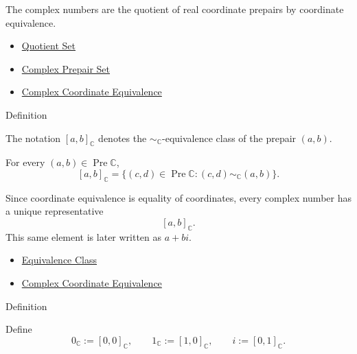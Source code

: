 \begin{remark*}[Interpretation]
The complex numbers are the quotient of real coordinate prepairs by coordinate
equivalence.
\end{remark*}

\begin{dependencies}
\begin{itemize}
  \item \hyperref[def:quotient-set]{Quotient Set}
  \item \hyperref[def:complex-prepair-set]{Complex Prepair Set}
  \item \hyperref[def:complex-coordinate-equivalence]{Complex Coordinate Equivalence}
\end{itemize}
\end{dependencies}

\begin{definitionbox}{Definition}
\begin{definition}
\label{def:complex-class-notation}
The notation $[a,b]_{\mathbb{C}}$ denotes the
\(\sim_{\mathbb{C}}\)-equivalence class of the prepair $(a,b)$.
\end{definition}
\end{definitionbox}

\begin{remark*}
For every $(a,b)\in\operatorname{Pre}\mathbb{C}$,
\[
[a,b]_{\mathbb{C}}=\{(c,d)\in\operatorname{Pre}\mathbb{C}:(c,d)\sim_{\mathbb{C}}(a,b)\}.
\]
\end{remark*}

\begin{remark*}[Interpretation]
Since coordinate equivalence is equality of coordinates, every complex number
has a unique representative
\[
[a,b]_{\mathbb{C}}.
\]
This same element is later written as $a+bi$.
\end{remark*}

\begin{dependencies}
\begin{itemize}
  \item \hyperref[def:equivalence-class]{Equivalence Class}
  \item \hyperref[def:complex-coordinate-equivalence]{Complex Coordinate Equivalence}
\end{itemize}
\end{dependencies}

\begin{definitionbox}{Definition}
\begin{definition}
\label{def:zero-one-i-in-c}
Define
\[
0_{\mathbb{C}}:=[0,0]_{\mathbb{C}},
\qquad
1_{\mathbb{C}}:=[1,0]_{\mathbb{C}},
\qquad
i:=[0,1]_{\mathbb{C}}.
\]
\end{definition}
\end{definitionbox}


